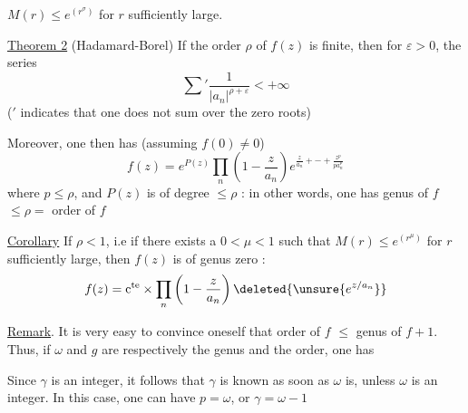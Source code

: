   $M(r)\leq e^{(r^\sigma)}$ for $r$ sufficiently large.

\uline{Theorem 2} (Hadamard-Borel) If the order $\rho$ of $f(z)$
is finite, then for  $\varepsilon>0$, the series
\[
\sum{}'\frac{1}{|a_n|^{\rho+\varepsilon}}<+\infty \tag*{(5)}
\]
($'$ indicates
that one does not sum over the zero roots)

Moreover, one then has (assuming $f(0)\ne0$)
\[
f(z)=e^{P(z)}\prod_n\left(1-\frac{z}{a_n}\right)e^{\frac{z}{a_n}+\mathord{-}+\frac{z^p}{p a_n^p}}
\]
where $p\leq\rho$, and $P(z)$ is  
of degree $\leq\rho$ : in other words, one
has \qquad genus of $f$ $\leq\rho=$ order of $f$

\uline{Corollary} \quad If $\rho<1$, i.e if there exists a $0<\mu<1$
such that $M(r)\leq e^{(r^\mu)}$ for $r$ sufficiently large,
then $f(z)$ is of genus zero :
\[
f(z)=\mathrm{c}^{\mathrm{te}}\mathbin{\times}\prod_n\left(1-\frac{z}{a_n}\right)\deleted{\unsure{e^{z/a_n}}}
\]

\uline{Remark}. \quad It is very easy to convince oneself
that \qquad order of $f$ $\leq$ genus of $f+1$. Thus, if $\omega$ and
$g$ are respectively the genus and the order, one has
\begin{center}
\end{center}

Since $\gamma$ is an integer, it follows that $\gamma$
is known as soon as $\omega$ is, unless $\omega$ is
an integer. In this case, one can have $p=\omega$, or
$\gamma=\omega-1$
